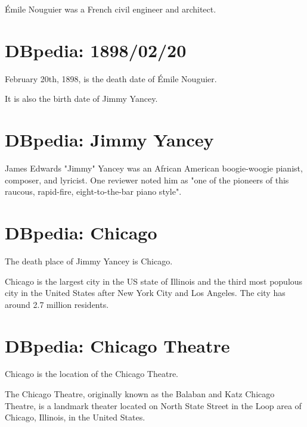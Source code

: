 \documentclass{article}
\begin{document}
Émile Nouguier was a French civil engineer and architect.

\section{DBpedia: 1898/02/20}
February 20th, 1898, is the death date of Émile Nouguier.

It is also the birth date of Jimmy Yancey.

\section{DBpedia: Jimmy Yancey}
James Edwards "Jimmy" Yancey was an African American boogie-woogie pianist, composer, and lyricist. One reviewer noted him as "one of the pioneers of this raucous, rapid-fire, eight-to-the-bar piano style".

\section{DBpedia: Chicago}
The death place of Jimmy Yancey is Chicago.

Chicago is the largest city in the US state of Illinois and the third most populous city in the United States after New York City and Los Angeles. The city has around 2.7 million residents.

\section{DBpedia: Chicago Theatre}
Chicago is the location of the Chicago Theatre.

The Chicago Theatre, originally known as the Balaban and Katz Chicago Theatre, is a landmark theater located on North State Street in the Loop area of Chicago, Illinois, in the United States.
\end{document}
